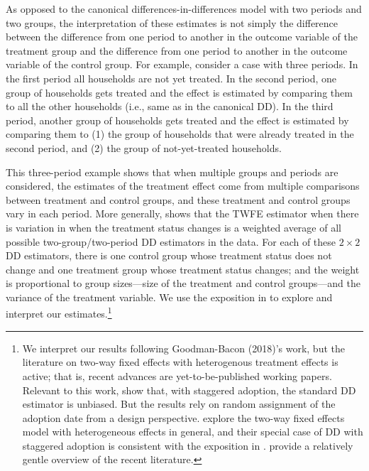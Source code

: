 \documentclass[12pt]{article}
\begin{document}
As opposed to the canonical differences-in-differences model with two periods and two groups, the interpretation of these estimates is not simply the difference between the difference from one period to another in the outcome variable of the treatment group and the difference from one period to another in the outcome variable of the control group. For example, consider a case with three periods. In the first period all households are not yet treated. In the second period, one group of households gets treated and the effect is estimated by comparing them to all the other households (i.e., same as in the canonical DD). In the third period, another group of households gets treated and the effect is estimated by comparing them to (1) the group of households that were already treated in the second period, and (2) the group of not-yet-treated households.

This three-period example shows that when multiple groups and periods are considered, the estimates of the treatment effect come from multiple comparisons between treatment and control groups, and these treatment and control groups vary in each period. More generally, \citet{goodman-baconDifferenceinDifferencesVariationTreatment2018} shows that the TWFE estimator when there is variation in when the treatment status changes is a weighted average of all possible two-group/two-period DD estimators in the data. For each of these $2 \times 2$ DD estimators, there is one control group whose treatment status does not change and one treatment group whose treatment status changes; and the weight is proportional to group sizes---size of the treatment and control groups---and the variance of the treatment variable. We use the exposition in \citet{goodman-baconDifferenceinDifferencesVariationTreatment2018} to explore and interpret our estimates.\footnote{We interpret our results following Goodman-Bacon (2018)'s work, but the literature on two-way fixed effects with heterogenous treatment effects is active; that is, recent advances are yet-to-be-published working papers. Relevant to this work, \citet{atheyDesignbasedAnalysisDifferenceInDifferences2018} show that, with staggered adoption, the standard DD estimator is unbiased. But the results rely on random assignment of the adoption date from a design perspective. \citet{dechaisemartinTwowayFixedEffects2020} explore the two-way fixed effects model with heterogeneous effects in general, and their special case of DD with staggered adoption is consistent with the exposition in \citet{goodman-baconDifferenceinDifferencesVariationTreatment2018}. \cite{bakerHowMuchShould2021} provide a relatively gentle overview of the recent literature.}
\end{document}
